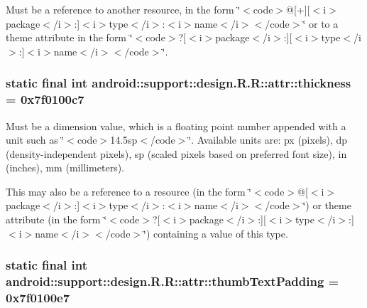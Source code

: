 Must be a reference to another resource, in the form \char`\"{}$<$code$>$@\mbox{[}+\mbox{]}\mbox{[}$<$i$>$package$<$/i$>$:\mbox{]}$<$i$>$type$<$/i$>$:$<$i$>$name$<$/i$>$$<$/code$>$\char`\"{} or to a theme attribute in the form \char`\"{}$<$code$>$?\mbox{[}$<$i$>$package$<$/i$>$:\mbox{]}\mbox{[}$<$i$>$type$<$/i$>$:\mbox{]}$<$i$>$name$<$/i$>$$<$/code$>$\char`\"{}. \hypertarget{classandroid_1_1support_1_1design_1_1_r_1_1attr_e47e1e7f8b55e851bfda2b78d48525f2}{
\subsubsection[{thickness}]{\setlength{\rightskip}{0pt plus 5cm}static final int android::support::design.R.R::attr::thickness = 0x7f0100c7}}
\label{classandroid_1_1support_1_1design_1_1_r_1_1attr_e47e1e7f8b55e851bfda2b78d48525f2}


Must be a dimension value, which is a floating point number appended with a unit such as \char`\"{}$<$code$>$14.5sp$<$/code$>$\char`\"{}. Available units are: px (pixels), dp (density-independent pixels), sp (scaled pixels based on preferred font size), in (inches), mm (millimeters). 

This may also be a reference to a resource (in the form \char`\"{}$<$code$>$@\mbox{[}$<$i$>$package$<$/i$>$:\mbox{]}$<$i$>$type$<$/i$>$:$<$i$>$name$<$/i$>$$<$/code$>$\char`\"{}) or theme attribute (in the form \char`\"{}$<$code$>$?\mbox{[}$<$i$>$package$<$/i$>$:\mbox{]}\mbox{[}$<$i$>$type$<$/i$>$:\mbox{]}$<$i$>$name$<$/i$>$$<$/code$>$\char`\"{}) containing a value of this type. \hypertarget{classandroid_1_1support_1_1design_1_1_r_1_1attr_9b6900c8d955189969c02d8298e38bd5}{
\subsubsection[{thumbTextPadding}]{\setlength{\rightskip}{0pt plus 5cm}static final int android::support::design.R.R::attr::thumbTextPadding = 0x7f0100e7}}
\label{classandroid_1_1support_1_1design_1_1_r_1_1attr_9b6900c8d955189969c02d8298e38bd5}


